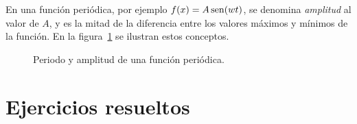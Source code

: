 En una función periódica, por ejemplo $f(x)=A\mathop{\rm sen}\nolimits(wt)$, se denomina \emph{amplitud} al valor de $A$, y es la mitad de la diferencia entre los valores máximos y mínimos de la función. En la figura~\ref{g:periodoyamplitud} se ilustran estos conceptos.

\begin{figure}[h!]
\centering
\scalebox{1}{}
\caption{Periodo y amplitud de una función periódica.}
\label{g:periodoyamplitud}
\end{figure}

\clearpage
\newpage

\section{Ejercicios resueltos}

